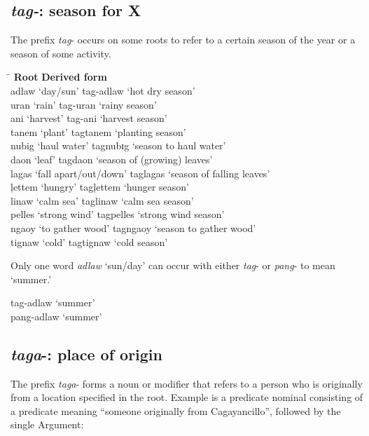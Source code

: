 \subsection{\textit{tag-}: season for X}
\label{sec:tag}

The prefix \textit{tag}{}- occurs on some roots to refer to a certain season of the year or a season of some activity.

\ea
\begin{tabbing}
\hspace{4.5cm} \= \kill
\textbf{Root} \> \textbf{Derived form} \\
adlaw ‘day/sun’ \>  tag{}-adlaw ‘hot dry season’ \\
uran ‘rain’ \> tag{}-uran ‘rainy season’ \\
ani ‘harvest’ \> tag{}-ani ‘harvest season’ \\
tanem ‘plant’ \> tagtanem ‘planting season’ \\
nubig ‘haul water’ \> tagnubɪg ‘season to haul water’ \\
daon ‘leaf’ \> tagdaon ‘season of (growing) leaves’ \\
lagas ‘fall apart/out/down’ \> taglagas ‘season of falling leaves’ \\
ļettem ‘hungry’ \> tagļettem ‘hunger season’ \\
linaw ‘calm sea’ \> taglinaw ‘calm sea season’ \\
pelles ‘strong wind’ \> tagpelles ‘strong wind season’ \\
ngaoy ‘to gather wood’ \> tagngaoy ‘season to gather wood’ \\
tignaw ‘cold’ \> tagtignaw ‘cold season’
\end{tabbing}
\z

Only one word \textit{adlaw} ‘sun/day’ can occur with either \textit{tag}{}- or \textit{pang}{}- to mean ‘summer.’

\ea
tag{}-adlaw ‘summer’ \\
pang{}-adlaw ‘summer’
\z
\subsection{\textit{taga}-: place of origin}
\label{sec:taga}

The prefix \textit{taga}{}- forms a noun or modifier that refers to a person who is originally from a location specified in the root. Example  is a predicate nominal consisting of a predicate meaning “someone originally from Cagayancillo”, followed by the single Argument:

